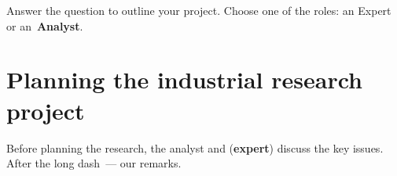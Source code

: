 \documentclass[12pt]{article}
\date{}
\begin{document}
\maketitle

Answer the question to outline your project. Choose one of the roles: an {Expert} or an~\textbf{Analyst}.


\section{Planning the industrial research project}
Before planning the research, the analyst and (\textbf{expert}) discuss the key issues. After the long dash~--- our remarks.
\end{document}
